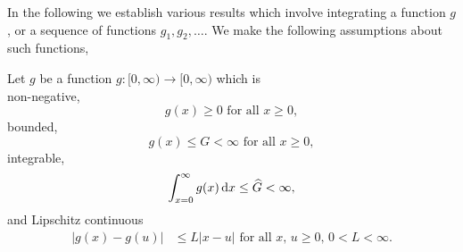 In the following we establish various results which involve integrating a function \(g\), or a sequence of functions \(g_1,g_2,\dots\). We make the following assumptions about such functions, 
\begin{asu}\label{asu: g}
	Let \(g\) be a function \(g:[0,\infty)\to [0,\infty)\) which is \\
	\subasu \label{asu: g non-neg} non-negative, 
	\[g(x) \geq 0 \mbox{ for all } x \geq 0,\]
	\subasu bounded, 
	\[g(x) \leq G < \infty \mbox{ for all } x \geq 0,\]
	\subasu integrable, 
	\[\int_{x=0}^\infty g(x)\, \mathrm{d} x \leq \widehat G < \infty,\]
	\subasu \label{asu: lipschitz} and Lipschitz continuous 
	\begin{align}
		|g(x) - g(u)|&\leq L|x - u| \mbox{ for all } x,\, u \geq 0,\, 0<L<\infty.
	\end{align}
\end{asu}

